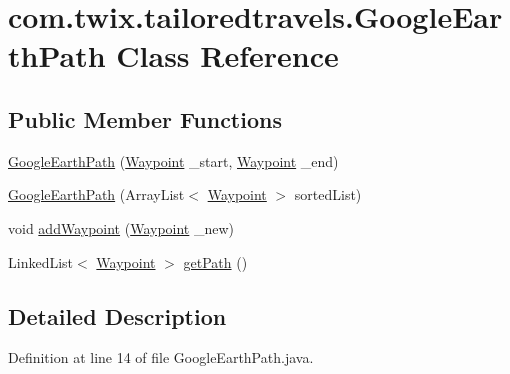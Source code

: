 \hypertarget{classcom_1_1twix_1_1tailoredtravels_1_1_google_earth_path}{\section{com.\-twix.\-tailoredtravels.\-Google\-Earth\-Path Class Reference}
\label{classcom_1_1twix_1_1tailoredtravels_1_1_google_earth_path}
}
\subsection*{Public Member Functions}
\begin{DoxyCompactItemize}
\item 
\hyperlink{classcom_1_1twix_1_1tailoredtravels_1_1_google_earth_path_aa15740bee3373d47996df6c15a35f221}{Google\-Earth\-Path} (\hyperlink{classcom_1_1twix_1_1tailoredtravels_1_1_waypoint}{Waypoint} \-\_\-start, \hyperlink{classcom_1_1twix_1_1tailoredtravels_1_1_waypoint}{Waypoint} \-\_\-end)
\item 
\hyperlink{classcom_1_1twix_1_1tailoredtravels_1_1_google_earth_path_a1da903f382a47ac383873b558fe093e4}{Google\-Earth\-Path} (Array\-List$<$ \hyperlink{classcom_1_1twix_1_1tailoredtravels_1_1_waypoint}{Waypoint} $>$ sorted\-List)
\item 
void \hyperlink{classcom_1_1twix_1_1tailoredtravels_1_1_google_earth_path_a8a45aedd969a5ecdfdaccee3cc83a449}{add\-Waypoint} (\hyperlink{classcom_1_1twix_1_1tailoredtravels_1_1_waypoint}{Waypoint} \-\_\-new)
\item 
Linked\-List$<$ \hyperlink{classcom_1_1twix_1_1tailoredtravels_1_1_waypoint}{Waypoint} $>$ \hyperlink{classcom_1_1twix_1_1tailoredtravels_1_1_google_earth_path_add0dbbb86bc1b39af5a41baec63c2577}{get\-Path} ()
\end{DoxyCompactItemize}


\subsection{Detailed Description}


Definition at line 14 of file Google\-Earth\-Path.\-java.



